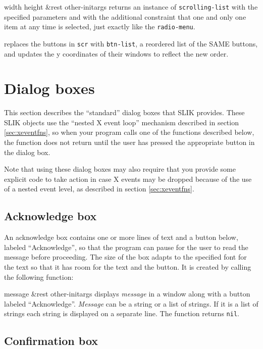 \documentclass[twoside,openright,11pt]{report}
\newcommand{\tp}[1]{\texttt{#1}}
\begin{document}
{width height \&rest other-initargs}
{returns an instance of \tp{scrolling-list} with the specified
parameters and with the additional constraint that one and only one
item at any time is selected, just exactly like the
\tp{radio-menu}.}

{replaces the buttons in \tp{scr} with \tp{btn-list}, a reordered list
of the SAME buttons, and updates the y coordinates of their windows to
reflect the new order.}

\section{Dialog boxes} \label{sec:dialog}

This section describes the ``standard'' dialog boxes that SLIK
provides.  These SLIK objects use the ``nested X event loop''
mechanism described in section \ref{sec:xeventfns}, so when your
program calls one of the functions described below, the function does
not return until the user has pressed the appropriate button in the
dialog box.

Note that using these dialog boxes may also require that you provide
some explicit code to take action in case X events may be dropped
because of the use of a nested event level, as described in section
\ref{sec:xeventfns}.

\subsection{Acknowledge box}

An acknowledge box contains one or more lines of text and a button
below, labeled ``Acknowledge'', so that the program can pause for the
user to read the message before proceeding.  The size of the box
adapts to the specified font for the text so that it has room for the
text and the button.  It is created by calling the following function:

{message \&rest other-initargs}
{displays \emph{message} in a window along with a button labeled
``Acknowledge''.  \emph{Message} can be a string or a list of strings.
If it is a list of strings each string is displayed on a separate
line.  The function returns \tp{nil}.}

\subsection{Confirmation box}
\end{document}

